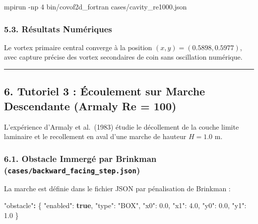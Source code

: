 \documentclass[
  french,
]{article}
\newenvironment{Shaded}{}{}
\newcommand{\AttributeTok}[1]{\textcolor[rgb]{0.49,0.56,0.16}{#1}}
\newcommand{\DataTypeTok}[1]{\textcolor[rgb]{0.56,0.13,0.00}{#1}}
\newcommand{\ErrorTok}[1]{\textcolor[rgb]{1.00,0.00,0.00}{\textbf{#1}}}
\newcommand{\ExtensionTok}[1]{#1}
\newcommand{\FloatTok}[1]{\textcolor[rgb]{0.25,0.63,0.44}{#1}}
\newcommand{\FunctionTok}[1]{\textcolor[rgb]{0.02,0.16,0.49}{#1}}
\newcommand{\KeywordTok}[1]{\textcolor[rgb]{0.00,0.44,0.13}{\textbf{#1}}}
\newcommand{\NormalTok}[1]{#1}
\newcommand{\StringTok}[1]{\textcolor[rgb]{0.25,0.44,0.63}{#1}}
\begin{document}
\begin{Shaded}
\begin{Highlighting}[]
\ExtensionTok{mpirun} \AttributeTok{{-}np}\NormalTok{ 4 bin/covof2d\_fortran cases/cavity\_re1000.json}
\end{Highlighting}
\end{Shaded}

\subsubsection{5.3. Résultats
Numériques}\label{ruxe9sultats-numuxe9riques}

Le vortex primaire central converge à la position
\((x, y) = (0.5898, 0.5977)\), avec capture précise des vortex
secondaires de coin sans oscillation numérique.

\begin{center}\rule{0.5\linewidth}{0.5pt}\end{center}

\subsection{6. Tutoriel 3 : Écoulement sur Marche Descendante (Armaly Re
=
100)}\label{tutoriel-3-uxe9coulement-sur-marche-descendante-armaly-re-100}

L'expérience d'Armaly et al.~(1983) étudie le décollement de la couche
limite laminaire et le recollement en aval d'une marche de hauteur
\(H = 1.0\text{ m}\).

\subsubsection{\texorpdfstring{6.1. Obstacle Immergé par Brinkman
(\texttt{cases/backward\_facing\_step.json})}{6.1. Obstacle Immergé par Brinkman (cases/backward\_facing\_step.json)}}\label{obstacle-immerguxe9-par-brinkman-casesbackward_facing_step.json}

La marche est définie dans le fichier JSON par pénalisation de Brinkman
:

\begin{Shaded}
\begin{Highlighting}[]
\StringTok{"obstacle"}\ErrorTok{:} \FunctionTok{\{}
  \DataTypeTok{"enabled"}\FunctionTok{:} \KeywordTok{true}\FunctionTok{,}
  \DataTypeTok{"type"}\FunctionTok{:} \StringTok{"BOX"}\FunctionTok{,}
  \DataTypeTok{"x0"}\FunctionTok{:} \FloatTok{0.0}\FunctionTok{,} \DataTypeTok{"x1"}\FunctionTok{:} \FloatTok{4.0}\FunctionTok{,}
  \DataTypeTok{"y0"}\FunctionTok{:} \FloatTok{0.0}\FunctionTok{,} \DataTypeTok{"y1"}\FunctionTok{:} \FloatTok{1.0}
\FunctionTok{\}}
\end{Highlighting}
\end{Shaded}
\end{document}
